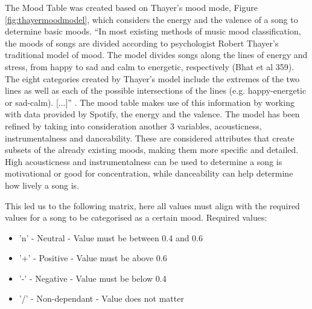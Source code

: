 \documentclass[10pt, notitlepage]{report}
\begin{document}
The Mood Table was created based on Thayer’s mood mode, Figure \ref{fig:thayermoodmodel}, which considers the energy and the valence of a song to determine basic moods. “In most existing methods of music mood classification, the moods of songs are divided according to psychologist Robert Thayer’s traditional model of mood. The model divides songs along the lines of energy and stress, from happy to sad and calm to energetic, respectively (Bhat et al 359). The eight categories created by Thayer’s model include the extremes of the two lines as well as each of the possible intersections of the lines (e.g. happy-energetic or sad-calm). [...]” \cite{Nuzzolo2015}. The mood table makes use of this information by working with data provided by Spotify, the energy and the valence. The model has been refined by taking into consideration another 3 variables, acousticness, instrumentalness and danceability. These are considered attributes that create subsets of the already existing moods, making them more specific and detailed. High acousticness and instrumentalness can be used to determine a song is motivational or good for concentration, while danceability can help determine how lively a song is. 

This led us to the following matrix, here all values must align with the required values for a song to be categorised as a certain mood.
Required values:
\begin{itemize}
\item 'n' - Neutral - Value must be between 0.4 and 0.6
\item '+' - Positive - Value must be above 0.6
\item '-' - Negative - Value must be below 0.4
\item '/' - Non-dependant - Value does not matter
\end{itemize} 
\end{document}
